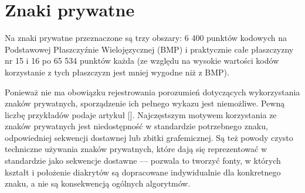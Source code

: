 


\section{Znaki prywatne}
\label{sec:znaki-prywatne}

Na znaki prywatne przeznaczone są trzy obszary: 6 400 punktów kodowych
na Podstawowej Płaszczyźnie Wielojęzycznej (BMP) i praktycznie całe
płaszczyzny nr 15 i 16 po 65 534 punktów każda (ze względu na wysokie
wartości kodów korzystanie z tych płaszczyzn jest mniej wygodne niż z
BMP).

Ponieważ nie ma obowiązku rejestrowania porozumień dotyczących
wykorzystania znaków prywatnych, sporządzenie ich pełnego wykazu jest
niemożliwe. Pewną liczbę przykładów podaje artykuł [\cite{wiki:PUA:2020}].
Najczęstszym motywem korzystania ze znaków prywatnych jest
niedostępność w standardzie potrzebnego znaku, odpowiedniej sekwencji
dostawnej lub zbitki grafemicznej. Są też powody czysto techniczne
używania znaków prywatnych, które dają się reprezentować w standardzie
jako sekwencje dostawne --- pozwala to tworzyć fonty, w których
kształt i położenie diakrytów są dopracowane indywidualnie dla
konkretnego znaku, a nie są konsekwencją ogólnych algorytmów.


